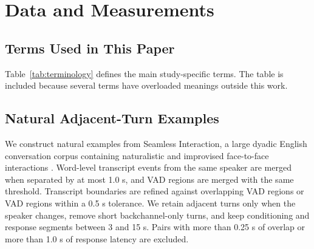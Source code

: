 \documentclass[conference]{IEEEtran}
\begin{document}
\section{Data and Measurements}
\subsection{Terms Used in This Paper}
Table~\ref{tab:terminology} defines the main study-specific terms.
The table is included because several terms have overloaded meanings outside this work.

\begin{table}[t]
\centering
\caption{Reader-facing terminology used throughout the paper.}
\label{tab:terminology}
\scriptsize
\setlength{\tabcolsep}{3.2pt}
\end{table}

\subsection{Natural Adjacent-Turn Examples}
We construct natural examples from Seamless Interaction, a large dyadic English conversation corpus containing naturalistic and improvised face-to-face interactions \cite{seamless_interaction}.
Word-level transcript events from the same speaker are merged when separated by at most 1.0 s, and VAD regions are merged with the same threshold.
Transcript boundaries are refined against overlapping VAD regions or VAD regions within a 0.5 s tolerance.
We retain adjacent turns only when the speaker changes, remove short backchannel-only turns, and keep conditioning and response segments between 3 and 15 s.
Pairs with more than 0.25 s of overlap or more than 1.0 s of response latency are excluded.
\end{document}
